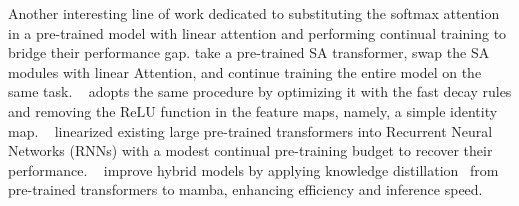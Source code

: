 Another interesting line of work dedicated to substituting the softmax attention in a pre-trained model with linear attention and performing continual training to bridge their performance gap. \citet{post_linearize_attn} take a pre-trained SA transformer, swap the SA modules with linear Attention, and continue training the entire model on the same task. ~\citet{Mao_fast_decay_weight} adopts the same procedure by optimizing it with the fast decay rules and removing the $\text{ReLU}$ function in the feature maps, namely, a simple identity map. ~\citet{DiJiang, uptraining_llm} linearized existing large pre-trained transformers into Recurrent Neural Networks (RNNs) with a modest continual pre-training budget to recover their performance. ~\citet{mambainllama} improve hybrid models by applying knowledge distillation~\citep{KD, RW-KD} from pre-trained transformers to mamba, enhancing efficiency and inference speed.